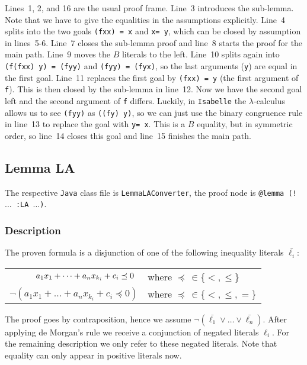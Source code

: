 \documentclass[10pt,a4paper]{article}
\newcommand{\isa}{\texttt{Isabelle}\xspace}
\newcommand{\jav}{\texttt{Java}\xspace}
\newcommand{\ttt}{\texttt}
\newcommand{\x}{\xX\xspace}
\newcommand{\y}{\yX\xspace}
\newcommand{\f}{\ttt{f}\xspace}
\newcommand{\xX}{\ttt{x}}
\newcommand{\yX}{\ttt{y}}
\begin{document}
Lines~1, 2, and 16 are the usual proof frame. Line~3 introduces the sub-lemma. Note that we have to give the equalities in the assumptions explicitly. Line~4 splits into the two goals \mbox{\ttt{(\f \x \x) = \x}} and \mbox{\ttt{\x = \y}}, which can be closed by assumption in lines~5-6. Line~7 closes the sub-lemma proof and line~8 starts the proof for the main path. Line~9 moves the $B$ literals to the left. Line~10 splits again into \mbox{\ttt{(\f (\f \x \x) \y) = (\f \y \y)}} and \mbox{\ttt{(\f \y \y) = (\f \y \x)}}, so the last arguments (\y) are equal in the first goal. Line~11 replaces the first goal by \mbox{\ttt{(\f \x \x) = \y}} (the first argument of \f). This is then closed by the sub-lemma in line~12. Now we have the second goal left and the second argument of \f differs. Luckily, in \isa the $\lambda$-calculus allows us to see \mbox{\ttt{(\f \y \y)}} as \mbox{\ttt{((\f \y) \y)}}, so we can just use the binary congruence rule in line~13 to replace the goal with \mbox{\ttt{\y = \x}}. This is a $B$ equality, but in symmetric order, so line~14 closes this goal and line~15 finishes the main path.
%
\subsection{Lemma LA}\label{sec:la}
The respective \jav class file is \ttt{LemmaLAConverter}, the proof node is \ttt{@lemma (! $\dots$ :LA $\dots$)}.
%
\subsubsection*{Description}
The proven formula is a disjunction of one of the following inequality literals $\bar{\ell_i}$:
%
\begin{center}
	\begin{tabular}{rl}
		$a_1 x_1 + \dots + a_n x_{k_i} + c_i \preceq 0\color{white}{)}$ & where $\preceq \, \in \{<, \leq\}$ \\
		$\neg(a_1 x_1 + \dots + a_n x_{k_i} + c_i \preceq 0)$ & where $\preceq \, \in \{<, \leq, =\}$
	\end{tabular}
\end{center}
%
The proof goes by contraposition, hence we assume $\neg(\bar{\ell_1} \lor \dots \lor \bar{\ell_n})$. After applying de Morgan's rule we receive a conjunction of negated literals $\ell_i$. For the remaining description we only refer to these negated literals. Note that equality can only appear in positive literals now.
\end{document}
